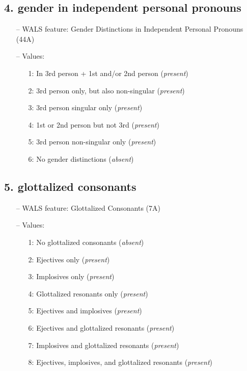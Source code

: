 \subsection*{4. gender in independent personal pronouns}

\begin{itemize}
  \item[--] WALS feature: Gender Distinctions in Independent Personal Pronouns (44A)
  \item[--] Values:
  {\small
  \begin{enumerate}
    \item[1:] In 3rd person + 1st and/or 2nd person (\emph{present})
    \item[2:] 3rd person only, but also non-singular (\emph{present})
    \item[3:] 3rd person singular only (\emph{present})
    \item[4:] 1st or 2nd person but not 3rd (\emph{present})
    \item[5:] 3rd person non-singular only (\emph{present})
    \item[6:] No gender distinctions (\emph{absent})
  \end{enumerate}
  }
\end{itemize}


\subsection*{5. glottalized consonants}

\begin{itemize}
  \item[--] WALS feature: Glottalized Consonants (7A)
  \item[--] Values:
  {\small
  \begin{enumerate}
    \item[1:] No glottalized consonants (\emph{absent})
    \item[2:] Ejectives only (\emph{present})
    \item[3:] Implosives only (\emph{present})
    \item[4:] Glottalized resonants only (\emph{present})
    \item[5:] Ejectives and implosives (\emph{present})
    \item[6:] Ejectives and glottalized resonants (\emph{present})
    \item[7:] Implosives and glottalized resonants (\emph{present})
    \item[8:] Ejectives, implosives, and glottalized resonants (\emph{present})
  \end{enumerate}
  }
\end{itemize}


